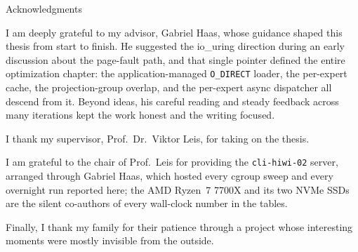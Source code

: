 \thispagestyle{empty}

\vspace*{20mm}

\begin{center}
    { Acknowledgments}
\end{center}

\vspace{10mm}

I am deeply grateful to my advisor, Gabriel Haas, whose guidance shaped this thesis from start to finish. He suggested the io\_uring direction during an early discussion about the page-fault path, and that single pointer defined the entire optimization chapter: the application-managed \texttt{O\_DIRECT} loader, the per-expert cache, the projection-group overlap, and the per-expert async dispatcher all descend from it. Beyond ideas, his careful reading and steady feedback across many iterations kept the work honest and the writing focused.

I thank my supervisor, Prof.\ Dr.\ Viktor Leis, for taking on the thesis.

I am grateful to the chair of Prof.\ Leis for providing the \texttt{cli-hiwi-02} server, arranged through Gabriel Haas, which hosted every cgroup sweep and every overnight run reported here; the AMD Ryzen~7 7700X and its two NVMe SSDs are the silent co-authors of every wall-clock number in the tables.

Finally, I thank my family for their patience through a project whose interesting moments were mostly invisible from the outside.

\cleardoublepage{}
